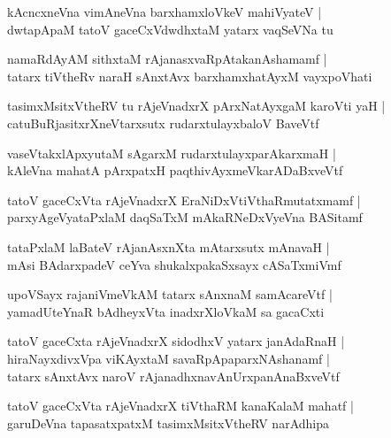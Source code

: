 \documentclass[twoside,12pt,openright]{book}
\newcounter{shloka}[chapter]
\begin{document}
\begin{shloka}
kAcncxneVna vimAneVna barxhamxloVkeV mahiVyateV |\\
dwtapApaM tatoV gaceCxVdwdhxtaM yatarx vaqSeVNa tu
\end{shloka}

\begin{shloka}
namaRdAyAM sithxtaM rAjanasxvaRpAtakanAshamamf |\\
tatarx tiVtheRv naraH sAnxtAvx barxhamxhatAyxM vayxpoVhati
\end{shloka}

\begin{shloka}
tasimxMsitxVtheRV tu rAjeVnadxrX pArxNatAyxgaM karoVti yaH |\\
catuBuRjasitxrXneVtarxsutx rudarxtulayxbaloV BaveVtf
\end{shloka}

\begin{shloka}
vaseVtakxlApxyutaM sAgarxM rudarxtulayxparAkarxmaH |\\
kAleVna mahatA pArxpatxH paqthivAyxmeVkarADaBxveVtf
\end{shloka}

\begin{shloka}
tatoV gaceCxVta rAjeVnadxrX EraNiDxVtiVthaRmutatxmamf |\\
parxyAgeVyataPxlaM daqSaTxM mAkaRNeDxVyeVna BASitamf 
\end{shloka}

\begin{shloka}
tataPxlaM laBateV rAjanAsxnXta mAtarxsutx mAnavaH |\\
mAsi BAdarxpadeV ceYva shukalxpakaSxsayx cASaTxmiVmf
\end{shloka}

\begin{shloka}
upoVSayx rajaniVmeVkAM tatarx sAnxnaM samAcareVtf |\\
yamadUteYnaR bAdheyxVta inadxrXloVkaM sa gacaCxti 
\end{shloka}

\begin{shloka}
tatoV gaceCxta rAjeVnadxrX sidodhxV yatarx janAdaRnaH |\\
hiraNayxdivxVpa viKAyxtaM savaRpApaparxNAshanamf |\\
tatarx sAnxtAvx naroV rAjanadhxnavAnUrxpanAnaBxveVtf
\end{shloka}

\begin{shloka}
tatoV gaceCxVta rAjeVnadxrX tiVthaRM kanaKalaM mahatf |\\
garuDeVna tapasatxpatxM tasimxMsitxVtheRV narAdhipa
\end{shloka}
\end{document}

